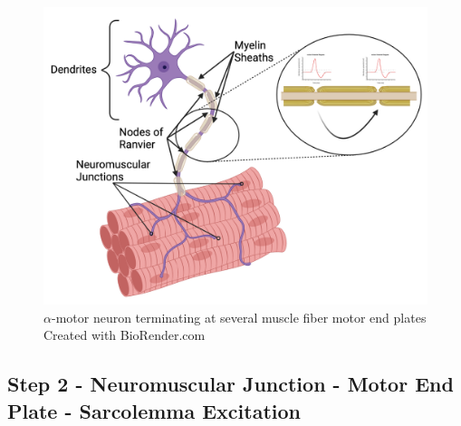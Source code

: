 \begin{figure}[!ht]
    \centering
    \includegraphics[width=1\linewidth]{./figure/Motoneuron.png}
    \caption{$\alpha$-motor neuron terminating at several muscle fiber motor end plates \footnotesize{Created with BioRender.com}}
    \label{fig:Motoneuron}
\end{figure}

\subsection{Step 2 - Neuromuscular Junction - Motor End Plate - Sarcolemma Excitation}

